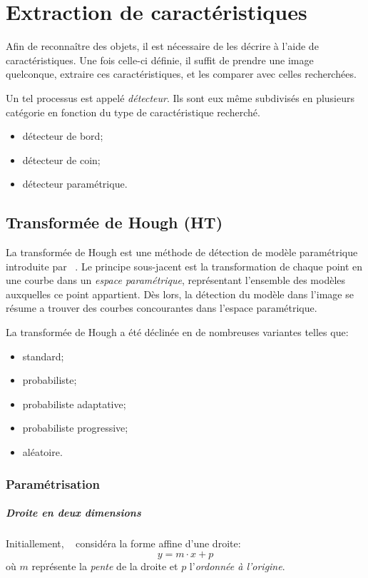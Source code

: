 \chapter{Extraction de caractéristiques}

Afin de reconnaître des objets, il est nécessaire de les décrire à l'aide de caractéristiques. Une fois celle-ci définie, il suffit de prendre une image quelconque, extraire ces caractéristiques, et les comparer avec celles recherchées.

Un tel processus est appelé \emph{détecteur}. Ils sont eux même subdivisés en plusieurs catégorie en fonction du type de caractéristique recherché.
\begin{itemize}
  \item détecteur de bord;
  \item détecteur de coin;
  \item détecteur paramétrique.
\end{itemize}

\section{Transformée de Hough (HT)}
La transformée de Hough est une méthode de détection de modèle paramétrique introduite par \citeauthor{Hough1962}~\cite{Hough1962}. Le principe sous-jacent est la transformation de chaque point en une courbe dans un \emph{espace paramétrique}, représentant l'ensemble des modèles auxquelles ce point appartient. Dès lors, la détection du modèle dans l'image se résume a trouver des courbes concourantes dans l'espace paramétrique.

La transformée de Hough a été déclinée en de nombreuses variantes telles que:
\begin{itemize}
  \item standard;
  \item probabiliste;
  \item probabiliste adaptative;
  \item probabiliste progressive;
  \item aléatoire.
\end{itemize}

\subsection{Paramétrisation}
\paragraph{Droite en deux dimensions}
Initiallement, \citeauthor{Hough1962}~\cite{Hough1962} considéra la forme affine d'une droite:
$$y = m \cdot x + p$$
où $m$ représente la \emph{pente} de la droite et $p$ l'\emph{ordonnée à l'origine}.

